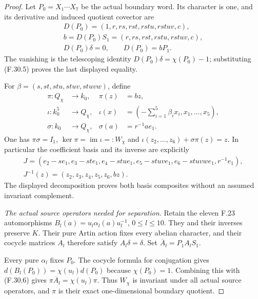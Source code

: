 \begin{proof}
Let $P_0=X_1\cdots X_7$ be the actual boundary word.
Its character is one, and its derivative and
induced quotient covector are
\[
 \begin{gathered}
 D(P_0)=(1,r,rs,rst,rstu,rstuv,c),\\
 b=D(P_0)S_1=(r,rs,rst,rstu,rstuv,c),\\
 D(P_0)\delta=0,\qquad D(P_0)=bP_1.
 \end{gathered}                                                \tag{F.30.6}
\]
The vanishing is the telescoping identity
$D(P_0)\delta=\chi(P_0)-1$; substituting
(F.30.5) proves the last displayed equality.

For $\beta=(s,st,stu,stuv,stuvw)$, define
\[
 \begin{aligned}
 \pi:Q_\chi&\longrightarrow k_0,
       &\pi(z)&=bz,\\
 \iota:k_0^5&\longrightarrow Q_\chi,
       &\iota(x)&=(-\textstyle\sum_{i=1}^5\beta_ix_i,x_1,\ldots,x_5),\\
 \sigma:k_0&\longrightarrow Q_\chi,
       &\sigma(a)&=r^{-1}a e_1.
 \end{aligned}                                                \tag{F.30.7}
\]
One has $\pi\sigma=I_1$,
$\ker\pi=\operatorname{im}\iota=:W_\chi$ and
$\iota(z_2,\ldots,z_6)+\sigma\pi(z)=z$.
In particular the coefficient basis and its
inverse are explicitly
\[
 \begin{gathered}
 J=(e_2-se_1,e_3-ste_1,e_4-stue_1,
                 e_5-stuve_1,e_6-stuvwe_1,r^{-1}e_1),\\
                  J^{-1}(z)=(z_2,z_3,z_4,z_5,z_6,bz).
 \end{gathered}                                                \tag{F.30.8}
\]
The displayed decomposition proves both
basis composites without an assumed invariant complement.

\emph{The actual source operators needed for separation.}
Retain the eleven F.23 automorphisms
$B_l(a)=u_l\alpha_l(a)u_l^{-1}$, $0\leq l\leq10$.
They and their inverses preserve $K$.
Their pure Artin action fixes every abelian
character, and their cocycle matrices $A_l$
therefore satisfy $A_l\delta=\delta$.
Set $\overline A_l=P_1A_lS_1$.

Every pure $\alpha_l$ fixes $P_0$. The cocycle
formula for conjugation gives
$d(B_l(P_0))=\chi(u_l)d(P_0)$ because
$\chi(P_0)=1$. Combining this with (F.30.6)
gives $\pi\overline A_l=\chi(u_l)\pi$.
Thus $W_\chi$ is invariant under all actual
source operators, and $\pi$ is their exact
one-dimensional boundary quotient.


\end{proof}
